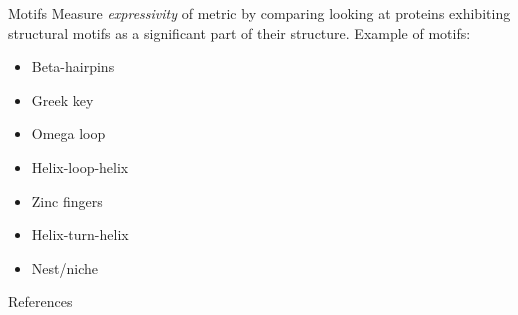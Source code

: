 \documentclass[aspectratio=169, 10pt, dvipsnames, handout]{beamer}
\begin{document}
\begin{frame}[fragile]{Motifs}
  Measure \textit{expressivity} of metric by comparing looking at proteins exhibiting
  structural motifs as a significant part of their structure. Example of motifs:
  \begin{itemize}
  \item Beta-hairpins
  \item Greek key
  \item Omega loop
  \item Helix-loop-helix
  \item Zinc fingers
  \item Helix-turn-helix
  \item Nest/niche
  \end{itemize}
\end{frame}

\begin{frame}[allowframebreaks]{References}

  
  

\end{frame}
\end{document}
